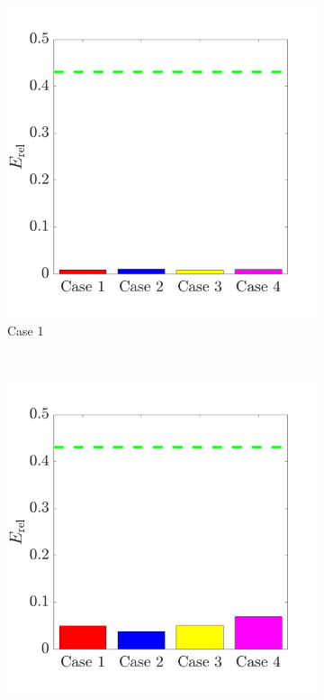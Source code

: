 \documentclass{jov}
\begin{document}
\begin{figure}
\centering
\begin{subfigure}{0.22 \textwidth}
	\includegraphics[width=\textwidth]{../Figures/Figure15/Figure15_a.pdf}
	\caption{Case 1}
	\label{fig:case1Bar}
    \end{subfigure}
    ~ 
    \begin{subfigure}{0.22 \textwidth}   
	\includegraphics[width=\textwidth]{../Figures/Figure15/Figure15_b.pdf}

\end{subfigure}
\end{figure}
\end{document}
